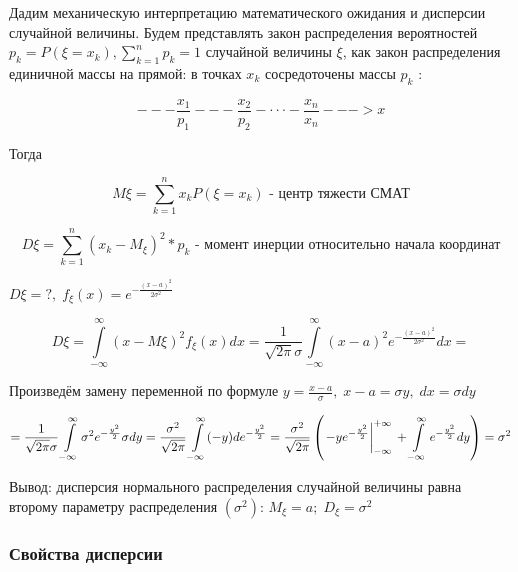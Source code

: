 ﻿\documentclass[a4paper,12pt]{report}
\begin{document}
	Дадим механическую интерпретацию математического ожидания и дисперсии случайной величины. Будем представлять закон распределения вероятностей $p_k = P(\xi = x_k), \sum\limits^n_{k=1}p_k = 1$ случайной величины $\xi$, как закон распределения единичной массы на прямой: в точках $x_k$ сосредоточены массы $p_k$ : 
	
	$$
	  ---\frac{x_1}{p_1}---\frac{x_2}{p_2}- \cdot \cdot \cdot -\frac{x_n}{x_n}--->x
	$$
	
	Тогда 
	
	$$
	  M\xi = \sum^n_{k=1} x_k P(\xi=x_k) \mbox{ - центр тяжести СМАТ}	
	$$ 

	$$
	  D\xi = \sum^n_{k=1} (x_k - M_\xi)^2 * p_k \mbox{ - момент инерции относительно начала координат}
	$$

 	 $D\xi = ?, \; f_\xi(x) = e^{-\frac{(x-a)^2}{2\sigma^2}}$

 	
 	$$
 	  D\xi = \int\limits^\infty_{-\infty}(x-M\xi)^2 f_\xi(x) dx
 	       = \frac{1}{\sqrt{2\pi}\sigma}\int\limits^\infty_{-\infty} (x-a)^2 e^{-\frac{(x-a)^2}{2\sigma^2}} dx
 	       = 
 	$$
 
 	Произведём замену переменной по формуле $y = \frac{x-a}{\sigma}, \; x - a = \sigma y, \; dx = \sigma dy$
 
 	$$
 	   = \frac{1}{\sqrt{2\pi}\sigma} \int\limits_{-\infty}^\infty \sigma^2 e^{-\frac{y^2}{2}} \sigma dy 
 	   = \frac{\sigma^2}{\sqrt{2\pi}}  \int\limits _{-\infty}^\infty (-y ) de^{-\frac{y^2}{2}} 
 	   = \frac{\sigma^2}{\sqrt{2\pi}} \left( \left. -ye^{-\frac{y^2}{2}} \right|^{+\infty}_{-\infty} \strut 
 	     + \int\limits_{-\infty}^\infty e^{-\frac{y^2}{2}} dy \right)
 	   = \sigma^2
 	 $$
 
	 Вывод: дисперсия нормального распределения случайной величины равна второму параметру распределения $(\sigma^2)$: $M_\xi = a; \; D_\xi = \sigma^2$

	


	
\subsubsection{Свойства дисперсии}
\end{document}
